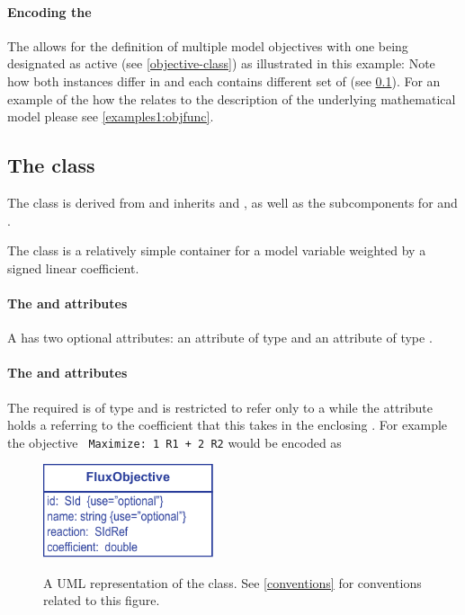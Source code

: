 \paragraph{Encoding the \Objective}
The \FBCPackage allows for the definition of multiple model objectives with
one being designated as active (see \ref{objective-class}) as illustrated in
this example:
%
%
Note how both \Objective instances differ in  and each contains
different set of  (see \ref{fluxobjective-class}).
For an example of the how the \Objective relates to the description of the underlying mathematical model please see \ref{examples1:objfunc}.

\subsection{The \FBC {} class}
\label{fluxobjective-class}

The \FBC \FluxObjective class is derived from \SBML \SBase and inherits
 and , as well as the subcomponents for
\Annotation and \Notes.

The \FluxObjective class is a relatively simple container for a model
variable weighted by a signed linear coefficient.

\paragraph{The  and  attributes}
A \FluxObjective has two optional attributes:  an attribute of type  and  an attribute of type .

\paragraph{The  and  attributes}
The required  is of type  and is restricted to refer only to a \Reaction while the  attribute holds a  referring to the coefficient that this \FluxObjective takes in the enclosing \Objective. For example the objective \texttt{ Maximize: 1 R1 + 2 R2} would be encoded as
%
%
\begin{figure}[h]
  \centering
  \includegraphics[width=5cm]{images/fbc_uml_fobj.pdf}\\
  \caption{A UML representation of the \FBCPackage \FluxObjective class. See
  \ref{conventions} for conventions related to this figure.}
  \label{fig:fbc_uml_fobj}
\end{figure}

